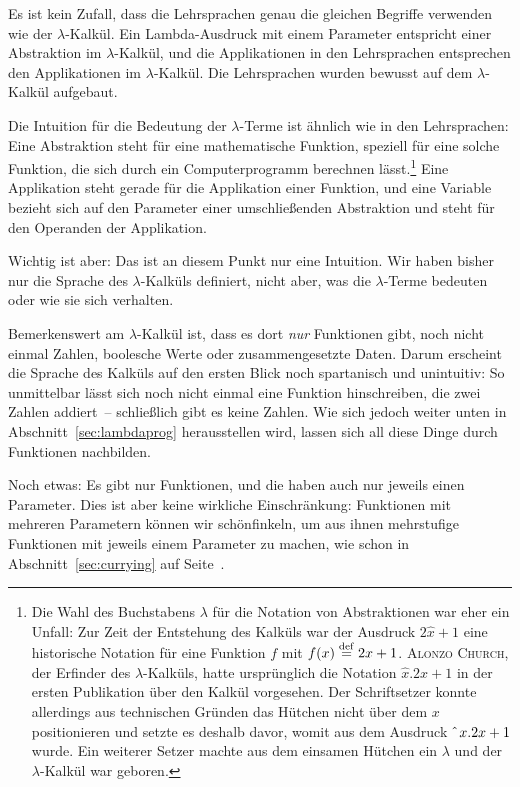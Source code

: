 Es ist kein Zufall, dass die Lehrsprachen genau die gleichen Begriffe verwenden
wie der $\lambda$-Kalkül.  Ein Lambda-Ausdruck mit einem
Parameter entspricht einer Abstraktion im $\lambda$-Kalkül,
und die Applikationen in den Lehrsprachen entsprechen den Applikationen im
$\lambda$-Kalkül.  Die Lehrsprachen wurden bewusst auf dem
$\lambda$-Kalkül aufgebaut.

Die Intuition für die Bedeutung der $\lambda$-Terme ist ähnlich wie in
den Lehrsprachen: Eine Abstraktion steht für eine mathematische Funktion,
speziell für eine solche Funktion, die sich durch ein Computerprogramm
berechnen lässt.\footnote{Die Wahl des Buchstabens $\lambda$ für die
  Notation von Abstraktionen war eher ein Unfall: Zur Zeit der
  Entstehung des Kalküls war der Ausdruck $2\hat{x}+1$ eine historische Notation für eine
  Funktion $f$ mit $f(x)\stackrel{\rm def}{=}{}2x+1$.  \textsc{Alonzo Church},
  der Erfinder des $\lambda$-Kalküls, hatte ursprünglich
  die Notation $\hat{x}.2x+1$ in der ersten Publikation über den
  Kalkül vorgesehen.  Der Schriftsetzer konnte allerdings aus
  technischen Gründen
  das Hütchen nicht über dem $x$ positionieren und setzte es deshalb
  davor, womit aus dem Ausdruck $\hat{~}\thinspace{}x.2x+1$ wurde.  Ein weiterer
  Setzer machte aus dem einsamen Hütchen ein $\lambda$ und der
  $\lambda$-Kalkül war geboren.}  Eine Applikation steht gerade für
die Applikation einer Funktion, und eine Variable bezieht sich auf den
Parameter einer umschließenden Abstraktion und steht für den Operanden
der Applikation.  

Wichtig ist aber: Das ist an diesem Punkt nur eine Intuition.  Wir
haben bisher nur die Sprache des $\lambda$-Kalküls definiert, nicht
aber, was die $\lambda$-Terme bedeuten oder wie sie sich verhalten.

Bemerkenswert am $\lambda$-Kalkül ist, dass es dort \emph{nur}
Funktionen gibt, noch nicht einmal Zahlen, boolesche Werte oder
zusammengesetzte Daten.  Darum erscheint die Sprache des Kalküls auf den
ersten Blick noch spartanisch und unintuitiv: So unmittelbar lässt sich
noch nicht einmal eine Funktion hinschreiben, die zwei Zahlen addiert~--
schließlich gibt es keine Zahlen.  Wie sich jedoch weiter unten in
Abschnitt~\ref{sec:lambdaprog} herausstellen wird, lassen sich all diese
Dinge durch Funktionen nachbilden.

Noch etwas: Es gibt nur Funktionen, und die haben auch nur jeweils
einen Parameter.  Dies ist aber keine wirkliche Einschränkung:
Funktionen mit mehreren Parametern können wir
schönfinkeln, um aus ihnen mehrstufige
Funktionen mit jeweils einem Parameter zu machen, wie schon in
Abschnitt~\ref{sec:currying} auf Seite~\pageref{sec:currying}.

